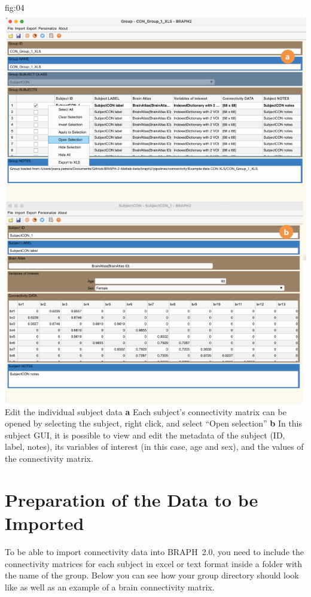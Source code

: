 \documentclass[justified]{tufte-handout}
\begin{document}
	{fig:04}
	{\includegraphics{fig04.png}
	}
	{Edit the individual subject data}
	{
	{\bf a}  Each subject's connectivity matrix can be opened by selecting the subject, right click, and select ``Open selection''
	{\bf b} In this subject GUI, it is possible to view and edit the metadata of the subject (ID, label, notes), its variables of interest (in this case, age and sex), and the values of the connectivity matrix. 
	}

\clearpage
\section{Preparation of the Data to be Imported}

To be able to import connectivity data into BRAPH~2.0, you need to include the connectivity matrices for each subject in excel or text format inside a folder with the name of the group. Below you can see how your group directory should look like as well as an example of a brain connectivity matrix.
\end{document}
